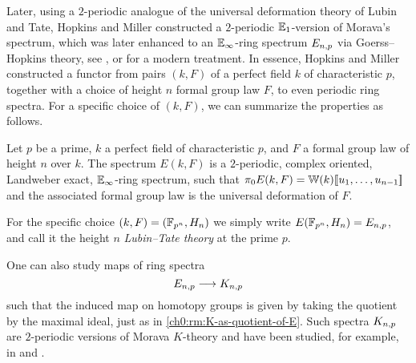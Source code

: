 Later, using a $2$-periodic analogue of the universal deformation theory of Lubin and Tate, Hopkins and Miller constructed a $2$-periodic $\mathbb{E}_1$-version of Morava's spectrum, which was later enhanced to an $\mathbb{E}_\infty$-ring spectrum $E_{n,p}$ via Goerss--Hopkins theory, see \cite{goerss-hopkins_04}, or \cite{pstragowski_vankoughnett_2022} for a modern treatment. In essence, Hopkins and Miller constructed a functor from pairs $(k, F)$ of a perfect field $k$ of characteristic $p$, together with a choice of height $n$ formal group law $F$, to even periodic ring spectra. For a specific choice of $(k, F)$, we can summarize the properties as follows.  

\begin{proposition}
    Let $p$ be a prime, $k$ a perfect field of characteristic $p$, and $F$ a formal group law of height $n$ over $k$. The spectrum $E(k,F)$ is a $2$-periodic, complex oriented, Landweber exact, $\mathbb{E}_\infty$-ring spectrum, such that $\pi_0 E(k,F)=\mathbb{W}(k)[\![ u_1, \ldots, u_{n-1}]\!]$ and the associated formal group law is the universal deformation of $F$. 
\end{proposition}




\begin{definition}
    For the specific choice $(k,F) = (\mathbb{F}_{p^n}, H_n)$ we simply write $E(\mathbb{F}_{p^n}, H_n) = E_{n,p}$, and call it the height $n$ \emph{Lubin--Tate theory} at the prime $p$. 
\end{definition}

\begin{remark}
    One can also study maps of ring spectra 
    \[E_{n,p} \longrightarrow K_{n,p}\] 
    such that the induced map on homotopy groups is given by taking the quotient by the maximal ideal, just as in \cref{ch0:rm:K-as-quotient-of-E}. Such spectra $K_{n,p}$ are $2$-periodic versions of Morava $K$-theory and have been studied, for example, in \cite{hopkins-lurie_17} and \cite{barthel-pstragowski_2021}. 
\end{remark}

